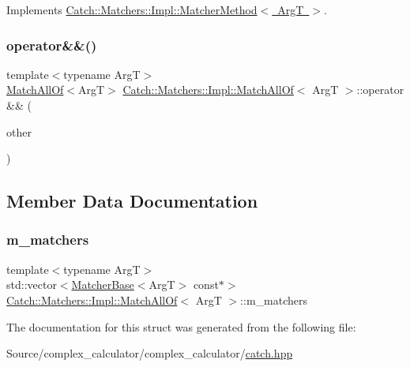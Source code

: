 Implements \mbox{\hyperlink{struct_catch_1_1_matchers_1_1_impl_1_1_matcher_method_ae0920ff9e817acf08e1bb0cbcb044e30}{Catch\+::\+Matchers\+::\+Impl\+::\+Matcher\+Method$<$ Arg\+T $>$}}.

\mbox{\label{struct_catch_1_1_matchers_1_1_impl_1_1_match_all_of_aa585510d47a76cd32178eec6000a41c9}} 
\subsubsection{\texorpdfstring{operator\&\&()}{operator\&\&()}}
{\footnotesize\ttfamily template$<$typename ArgT$>$ \\
\mbox{\hyperlink{struct_catch_1_1_matchers_1_1_impl_1_1_match_all_of}{Match\+All\+Of}}$<$ArgT$>$ \mbox{\hyperlink{struct_catch_1_1_matchers_1_1_impl_1_1_match_all_of}{Catch\+::\+Matchers\+::\+Impl\+::\+Match\+All\+Of}}$<$ ArgT $>$\+::operator \&\& (\begin{DoxyParamCaption}\item[{\mbox{\hyperlink{struct_catch_1_1_matchers_1_1_impl_1_1_matcher_base}{Matcher\+Base}}$<$ ArgT $>$ const \&}]{other }\end{DoxyParamCaption})\hspace{0.3cm}{\ttfamily [inline]}}



\subsection{Member Data Documentation}
\mbox{\label{struct_catch_1_1_matchers_1_1_impl_1_1_match_all_of_a98d6a2611f195a4a5c49f92fd877be9a}} 
\subsubsection{\texorpdfstring{m\+\_\+matchers}{m\_matchers}}
{\footnotesize\ttfamily template$<$typename ArgT$>$ \\
std\+::vector$<$\mbox{\hyperlink{struct_catch_1_1_matchers_1_1_impl_1_1_matcher_base}{Matcher\+Base}}$<$ArgT$>$ const$\ast$$>$ \mbox{\hyperlink{struct_catch_1_1_matchers_1_1_impl_1_1_match_all_of}{Catch\+::\+Matchers\+::\+Impl\+::\+Match\+All\+Of}}$<$ ArgT $>$\+::m\+\_\+matchers}



The documentation for this struct was generated from the following file\+:\begin{DoxyCompactItemize}
\item 
Source/complex\+\_\+calculator/complex\+\_\+calculator/\mbox{\hyperlink{catch_8hpp}{catch.\+hpp}}\end{DoxyCompactItemize}
